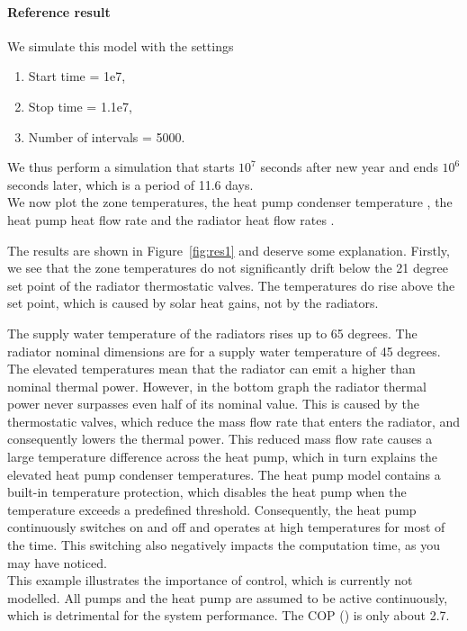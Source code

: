 \documentclass[10pt,a4paper]{article}
\begin{document}
\paragraph{Reference result}
We simulate this model with the settings
\begin{enumerate}
\item Start time = 1e7,
\item Stop time = 1.1e7,
\item Number of intervals = 5000.
\end{enumerate}
We thus perform a simulation that starts $10^7$ seconds after new year and ends $10^6$
seconds later, which is a period of 11.6 days.\\


We now plot the zone temperatures, 
the heat pump condenser temperature ,
the heat pump heat flow rate 
and the radiator heat flow rates .

The results are shown in Figure~\ref{fig:res1} and deserve some explanation.
Firstly, we see that the zone temperatures do not significantly drift below
the 21 degree set point of the radiator thermostatic valves.
The temperatures do rise above the set point, 
which is caused by solar heat gains, not by the radiators.

The supply water temperature of the radiators rises up to 65 degrees.
The radiator nominal dimensions are for a supply water temperature of
45 degrees. The elevated temperatures mean that the radiator can
emit a higher than nominal thermal power.
However, in the bottom graph the radiator thermal power never surpasses
even half of its nominal value.
This is caused by the thermostatic valves, which reduce the mass flow rate
that enters the radiator, and consequently lowers the thermal power.
This reduced mass flow rate causes a large temperature difference across the heat pump,
which in turn explains the elevated heat pump condenser temperatures.
The heat pump model contains a built-in temperature protection, which disables
the heat pump when the temperature exceeds a predefined threshold.
Consequently, the heat pump continuously switches on and off
and operates at high temperatures for most of the time.
This switching also negatively impacts the computation time, 
as you may have noticed.\\

This example illustrates the importance of control, which is currently not modelled.
All pumps and the heat pump are assumed to be active continuously, 
which is detrimental for the system performance.
The COP () is only about 2.7.
\end{document}
